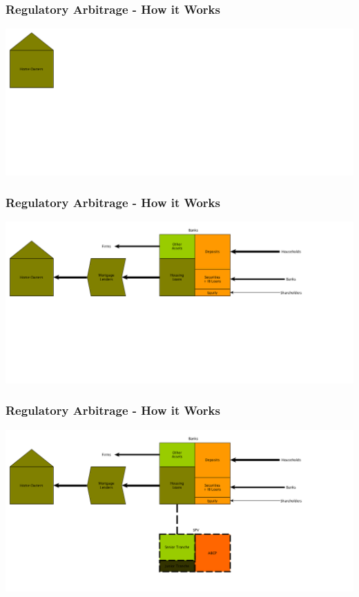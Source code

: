 \documentclass[11pt]{beamer}
\begin{document}
\begin{frame}
  \frametitle{Regulatory Arbitrage - How it Works}
  \begin{center}
    \includegraphics[width=\textwidth]{Figures/Securitization1.png}
  \end{center}
\end{frame}
\begin{frame}
  \frametitle{Regulatory Arbitrage - How it Works}
  \begin{center}
    \includegraphics[width=\textwidth]{Figures/Securitization2.png}
  \end{center}
\end{frame}
\begin{frame}
  \frametitle{Regulatory Arbitrage - How it Works}
  \begin{center}
    \includegraphics[width=\textwidth]{Figures/Securitization3.png}
  \end{center}
\end{frame}
\end{document}
